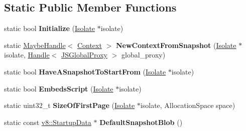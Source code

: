 \subsection*{Static Public Member Functions}
\begin{DoxyCompactItemize}
\item 
static bool {\bfseries Initialize} (\hyperlink{classv8_1_1internal_1_1_isolate}{Isolate} $\ast$isolate)\hypertarget{classv8_1_1internal_1_1_snapshot_a5054ae7a1ee4b2db6052099fbbddb401}{}\label{classv8_1_1internal_1_1_snapshot_a5054ae7a1ee4b2db6052099fbbddb401}

\item 
static \hyperlink{classv8_1_1internal_1_1_maybe_handle}{Maybe\+Handle}$<$ \hyperlink{classv8_1_1internal_1_1_context}{Context} $>$ {\bfseries New\+Context\+From\+Snapshot} (\hyperlink{classv8_1_1internal_1_1_isolate}{Isolate} $\ast$isolate, \hyperlink{classv8_1_1internal_1_1_handle}{Handle}$<$ \hyperlink{classv8_1_1internal_1_1_j_s_global_proxy}{J\+S\+Global\+Proxy} $>$ global\+\_\+proxy)\hypertarget{classv8_1_1internal_1_1_snapshot_a3b05e6b57f1200165ca7225750178fb5}{}\label{classv8_1_1internal_1_1_snapshot_a3b05e6b57f1200165ca7225750178fb5}

\item 
static bool {\bfseries Have\+A\+Snapshot\+To\+Start\+From} (\hyperlink{classv8_1_1internal_1_1_isolate}{Isolate} $\ast$isolate)\hypertarget{classv8_1_1internal_1_1_snapshot_ac1eb407d305328582b212a1fc5bcbfaf}{}\label{classv8_1_1internal_1_1_snapshot_ac1eb407d305328582b212a1fc5bcbfaf}

\item 
static bool {\bfseries Embeds\+Script} (\hyperlink{classv8_1_1internal_1_1_isolate}{Isolate} $\ast$isolate)\hypertarget{classv8_1_1internal_1_1_snapshot_af184992c0dfe5bed33951b55a0abe6b1}{}\label{classv8_1_1internal_1_1_snapshot_af184992c0dfe5bed33951b55a0abe6b1}

\item 
static uint32\+\_\+t {\bfseries Size\+Of\+First\+Page} (\hyperlink{classv8_1_1internal_1_1_isolate}{Isolate} $\ast$isolate, Allocation\+Space space)\hypertarget{classv8_1_1internal_1_1_snapshot_a10420df192bfa48220b9dfe5e725eb71}{}\label{classv8_1_1internal_1_1_snapshot_a10420df192bfa48220b9dfe5e725eb71}

\item 
static const \hyperlink{classv8_1_1_startup_data}{v8\+::\+Startup\+Data} $\ast$ {\bfseries Default\+Snapshot\+Blob} ()\hypertarget{classv8_1_1internal_1_1_snapshot_a5581dcad3c8aebccb9e9ad5fd641cf03}{}\label{classv8_1_1internal_1_1_snapshot_a5581dcad3c8aebccb9e9ad5fd641cf03}


\end{DoxyCompactItemize}
